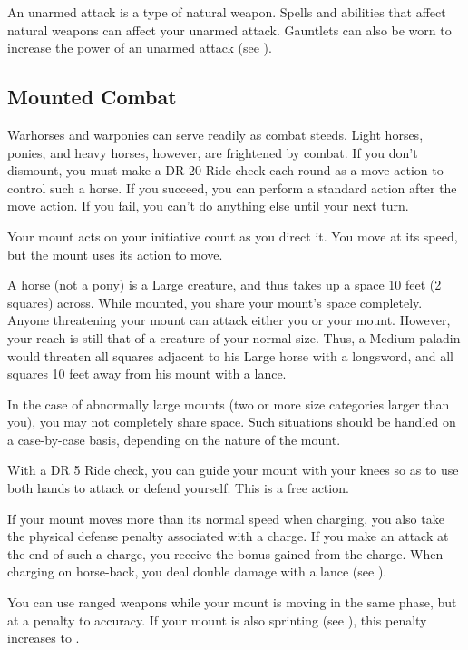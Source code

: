         An unarmed attack is a type of natural weapon.
        Spells and abilities that affect natural weapons can affect your unarmed attack.
        Gauntlets can also be worn to increase the power of an unarmed attack (see ).

    \subsection{Mounted Combat}\label{Mounted Combat}
         Warhorses and warponies can serve readily as combat steeds. Light horses, ponies, and heavy horses, however, are frightened by combat. If you don't dismount, you must make a DR 20 Ride check each round as a move action to control such a horse. If you succeed, you can perform a standard action after the move action. If you fail, you can't do anything else until your next turn.

        Your mount acts on your initiative count as you direct it. You move at its speed, but the mount uses its action to move.

         A horse (not a pony) is a Large creature, and thus takes up a space 10 feet (2 squares) across. While mounted, you share your mount's space completely. Anyone threatening your mount can attack either you or your mount. However, your reach is still that of a creature of your normal size. Thus, a Medium paladin would threaten all squares adjacent to his Large horse with a longsword, and all squares 10 feet away from his mount with a lance.

        In the case of abnormally large mounts (two or more size categories larger than you), you may not completely share space. Such situations should be handled on a case-by-case basis, depending on the nature of the mount.

         With a DR 5 Ride check, you can guide your mount with your knees so as to use both hands to attack or defend yourself. This is a free action.

        If your mount moves more than its normal speed when charging, you also take the physical defense penalty associated with a charge. If you make an attack at the end of such a charge, you receive the bonus gained from the charge. When charging on horse-back, you deal double damage with a lance (see ).

        You can use ranged weapons while your mount is moving in the same phase, but at a  penalty to accuracy.
        If your mount is also sprinting (see ), this penalty increases to .

